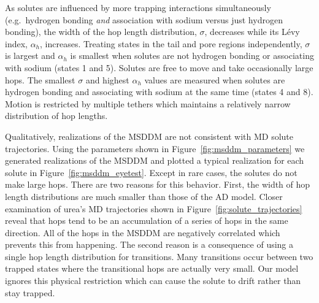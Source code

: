 \documentclass{article}
\begin{document}
  As solutes are influenced by more trapping interactions simultaneously (e.g.~hydrogen
  bonding \textit{and} association with sodium versus just hydrogen bonding), the 
  width of the hop length distribution, $\sigma$, decreases while its L\'evy index,
  $\alpha_h$, increases. Treating states in the tail and pore regions independently, 
  $\sigma$ is largest and $\alpha_h$ is smallest when solutes are not hydrogen bonding
  or associating with sodium (states 1 and 5). Solutes are free to move and take 
  occasionally large hops. The smallest $\sigma$ and highest $\alpha_h$ values are
  measured when solutes are hydrogen bonding and associating with sodium at the
  same time (states 4 and 8). Motion is restricted by multiple tethers which 
  maintains a relatively narrow distribution of hop lengths.
  

  Qualitatively, realizations of the MSDDM are not consistent with MD solute
  trajectories. Using the parameters shown in Figure~\ref{fig:msddm_parameters}
  we generated realizations of the MSDDM and plotted a typical realization for each
  solute in Figure~\ref{fig:msddm_eyetest}. Except in rare cases, the solutes do not make
  large hops. There are two reasons for this behavior. First, the width of 
  hop length distributions are much smaller than those of the AD model. Closer
  examination of urea's MD trajectories shown in Figure~\ref{fig:solute_trajectories} 
  reveal that hops tend to be an accumulation of a series of hops in the same direction.
  All of the hops in the MSDDM are negatively correlated which prevents this from happening.
  The second reason is a consequence of using a single hop length distribution 
  for transitions. Many transitions occur between two trapped states where the 
  transitional hops are actually very small. Our model ignores this physical 
  restriction which can cause the solute to drift rather than stay trapped.
  
\end{document}
